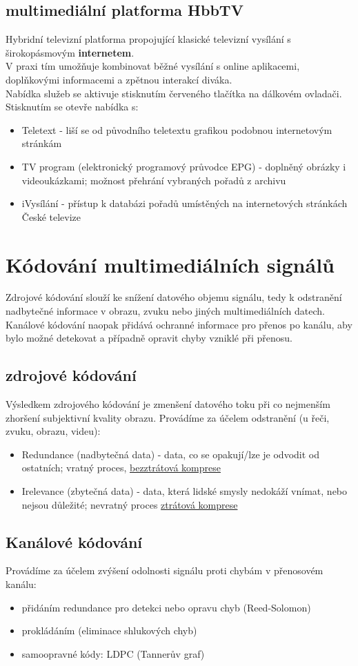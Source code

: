 \subsection{multimediální platforma HbbTV}
Hybridní televizní platforma propojující klasické televizní vysílání s širokopásmovým \textbf{internetem}.\\
V praxi tím umožňuje kombinovat běžné vysílání s online aplikacemi, doplňkovými informacemi a zpětnou interakcí diváka.\\
Nabídka služeb se aktivuje stisknutím červeného tlačítka na dálkovém ovladači. Stisknutím se otevře nabídka s:
\begin{itemize}
	\item Teletext - liší se od původního teletextu grafikou podobnou internetovým stránkám
	\item TV program (elektronický programový průvodce EPG) - doplněný obrázky i videoukázkami; možnost přehrání vybraných pořadů z archivu
	\item iVysílání - přístup k databázi pořadů umístěných na internetových stránkách České televize
\end{itemize}

\section{Kódování multimediálních signálů}
Zdrojové kódování slouží ke snížení datového objemu signálu, tedy k odstranění nadbytečné informace v obrazu, zvuku nebo jiných multimediálních datech. Kanálové kódování naopak přidává ochranné informace pro přenos po kanálu, aby bylo možné detekovat a případně opravit chyby vzniklé při přenosu. 
\subsection{zdrojové kódování}
Výsledkem zdrojového kódování je zmenšení datového toku při co nejmenším zhoršení subjektivní kvality obrazu.
Provádíme za účelem odstranění (u řeči, zvuku, obrazu, videu):
\begin{itemize}
	\item Redundance (nadbytečná data) - data, co se opakují/lze je odvodit od ostatních; vratný proces, \underline{bezztrátová komprese}
	\item Irelevance (zbytečná data) - data, která lidské smysly nedokáží vnímat, nebo nejsou důležité; nevratný proces \underline{ztrátová komprese}
\end{itemize}

\subsection{Kanálové kódování}
Provádíme za účelem zvýšení odolnosti signálu proti chybám v přenosovém kanálu:
\begin{itemize}
	\item přidáním redundance pro detekci nebo opravu chyb (Reed-Solomon)
	\item prokládáním (eliminace shlukových chyb)
	\item samoopravné kódy: LDPC (Tannerův graf)
\end{itemize}

